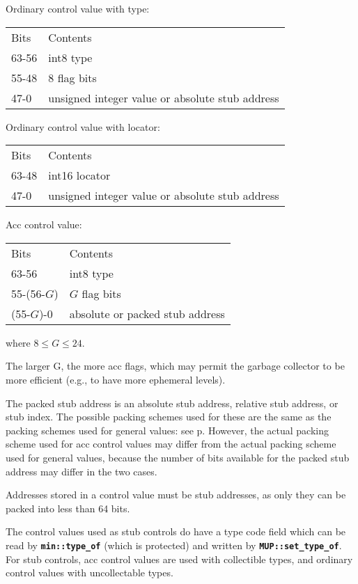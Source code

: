 \documentclass[12pt]{article}
\newcommand{\TT}[1]{{\tt \bfseries #1}}
\newcommand{\pagref}[1]{p\pageref{#1}}
\newenvironment{indpar}[1][0.3in]%
	{\begin{list}{}%
		     {\setlength{\itemsep}{0in}%
		      \setlength{\topsep}{0in}%
		      \setlength{\parsep}{1ex}%
		      \setlength{\labelwidth}{#1}%
		      \setlength{\leftmargin}{#1}%
		      \addtolength{\leftmargin}{\labelsep}}%
	 \item}%
	{\end{list}}
\begin{document}
\begin{indpar}
Ordinary control value with type: \\[1ex]
\hspace*{0.2in}\begin{tabular}{ll}
Bits & Contents \\[1ex]
63-56 & int8 type \\
55-48 & 8 flag bits \\
47-0 & unsigned integer value or absolute stub address
\end{tabular}

Ordinary control value with locator: \\[1ex]
\hspace*{0.2in}\begin{tabular}{ll}
Bits & Contents \\[1ex]
63-48 & int16 locator \\
47-0 & unsigned integer value or absolute stub address
\end{tabular}

Acc control value: \\[1ex]
\hspace*{0.2in}\begin{tabular}{ll}
Bits & Contents \\[1ex]
63-56 & int8 type \\
55-(56-$G$) & $G$ flag bits \\
(55-$G$)-0 & absolute or packed stub address
\end{tabular}

where $8\leq G\leq 24$.
\end{indpar}

The larger G, the more acc flags, which may permit the
garbage collector to be more efficient (e.g., to have more ephemeral
levels).

The packed stub address is an absolute stub address,
relative stub address, or stub index.  The possible packing schemes used for
these are the same as the packing schemes used for general values:
see \pagref{STUB-ADDRESS-PACKING}.  However, the actual packing scheme
used for acc control values may differ from the actual packing scheme
used for general values, because the number of bits available for the
packed stub address may differ in the two cases.

Addresses stored in a control value must be stub addresses, as only they
can be packed into less than 64 bits.

The control values used as stub controls do have a type code field which
can be read by \TT{min::type\_of} (which is protected) and
written by \TT{MUP::set\_type\_of}.  For stub controls,
acc control values are used with
collectible types, and ordinary control values with
uncollectable types.
\end{document}
